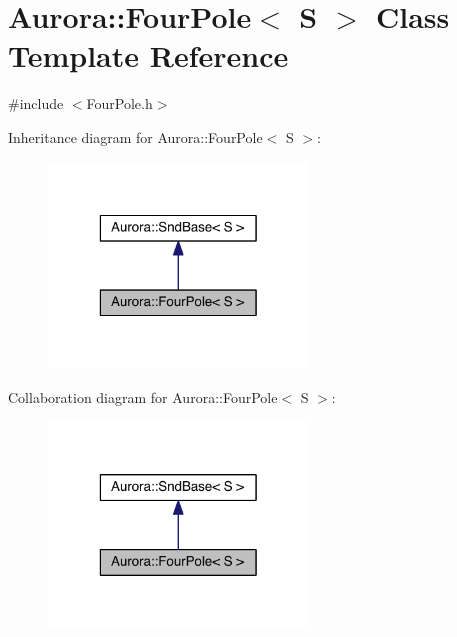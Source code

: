 \hypertarget{class_aurora_1_1_four_pole}{}\section{Aurora\+:\+:Four\+Pole$<$ S $>$ Class Template Reference}
\label{class_aurora_1_1_four_pole}


{\ttfamily \#include $<$Four\+Pole.\+h$>$}



Inheritance diagram for Aurora\+:\+:Four\+Pole$<$ S $>$\+:\nopagebreak
\begin{figure}[H]
\begin{center}
\leavevmode
\includegraphics[width=196pt]{class_aurora_1_1_four_pole__inherit__graph}
\end{center}
\end{figure}


Collaboration diagram for Aurora\+:\+:Four\+Pole$<$ S $>$\+:\nopagebreak
\begin{figure}[H]
\begin{center}
\leavevmode
\includegraphics[width=196pt]{class_aurora_1_1_four_pole__coll__graph}
\end{center}
\end{figure}
